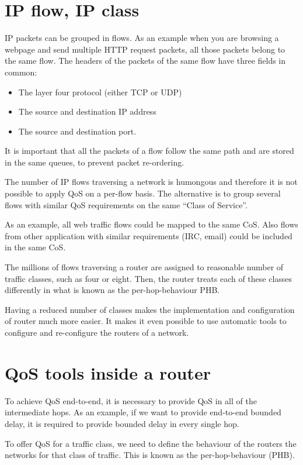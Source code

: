 \section{IP flow, IP class}

IP packets can be grouped in flows.
As an example when you are browsing a webpage and send multiple HTTP request packets, all those packets belong to the same flow.
The headers of the packets of the same flow have three fields in common:

\begin{itemize}
\item The layer four protocol (either TCP or UDP)
\item The source and destination IP address
\item The source and destination port.
\end{itemize}

It is important that all the packets of a flow follow the same path and are stored in the same queues, to prevent packet re-ordering.

The number of IP flows traversing a network is humongous and therefore it is not possible to apply QoS on a per-flow basis.
The alternative is to group several flows with similar QoS requirements on the same ``Class of Service''.

As an example, all web traffic flows could be mapped to the same CoS.
Also flows from other application with similar requirements (IRC, email) could be included in the same CoS.

The millions of flows traversing a router are assigned to reasonable number of traffic classes, such as four or eight.
Then, the router treats each of these classes differently in what is known as the per-hop-behaviour PHB.

Having a reduced number of classes makes the implementation and configuration of router much more easier.
It makes it even possible to use automatic tools to configure and re-configure the routers of a network.

\section{QoS tools inside a router}

To achieve QoS end-to-end, it is necessary to provide QoS in all of the intermediate hops.
As an example, if we want to provide end-to-end bounded delay, it is required to provide  bounded delay in every single hop.

To offer QoS for a traffic class, we need to define the behaviour of the routers the networks for that class of traffic.
This is known as the per-hop-behaviour (PHB).


